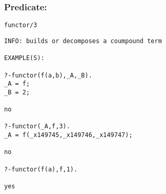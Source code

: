 \subsubsection{Predicate:} \label{functorV95W3}

\begin{verbatim}
functor/3
\end{verbatim}

{\small \begin{verbatim}
INFO: builds or decomposes a coumpound term

EXAMPLE(S):

?-functor(f(a,b),_A,_B).
_A = f;
_B = 2;

no

?-functor(_A,f,3).
_A = f(_x149745,_x149746,_x149747);

no

?-functor(f(a),f,1).

yes

\end{verbatim}}
